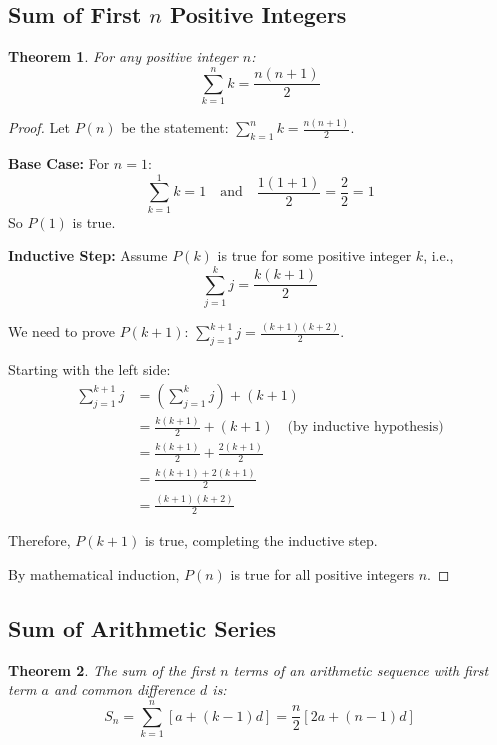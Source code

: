 \documentclass[12pt]{article}
\newtheorem{theorem}{Theorem}
\begin{document}
\subsection{Sum of First $n$ Positive Integers}

\begin{theorem}
For any positive integer $n$:
$$\sum_{k=1}^{n} k = \frac{n(n+1)}{2}$$
\end{theorem}

\begin{proof}
Let $P(n)$ be the statement: $\sum_{k=1}^{n} k = \frac{n(n+1)}{2}$.

\textbf{Base Case:} For $n = 1$:
$$\sum_{k=1}^{1} k = 1 \quad \text{and} \quad \frac{1(1+1)}{2} = \frac{2}{2} = 1$$
So $P(1)$ is true.

\textbf{Inductive Step:} Assume $P(k)$ is true for some positive integer $k$, i.e.,
$$\sum_{j=1}^{k} j = \frac{k(k+1)}{2}$$

We need to prove $P(k+1)$: $\sum_{j=1}^{k+1} j = \frac{(k+1)(k+2)}{2}$.

Starting with the left side:
\begin{align}
\sum_{j=1}^{k+1} j &= \left(\sum_{j=1}^{k} j\right) + (k+1) \\
&= \frac{k(k+1)}{2} + (k+1) \quad \text{(by inductive hypothesis)} \\
&= \frac{k(k+1)}{2} + \frac{2(k+1)}{2} \\
&= \frac{k(k+1) + 2(k+1)}{2} \\
&= \frac{(k+1)(k+2)}{2}
\end{align}

Therefore, $P(k+1)$ is true, completing the inductive step.

By mathematical induction, $P(n)$ is true for all positive integers $n$.
\end{proof}

\subsection{Sum of Arithmetic Series}

\begin{theorem}
The sum of the first $n$ terms of an arithmetic sequence with first term $a$ and common difference $d$ is:
$$S_n = \sum_{k=1}^{n} [a + (k-1)d] = \frac{n}{2}[2a + (n-1)d]$$
\end{theorem}
\end{document}
